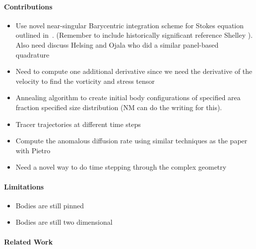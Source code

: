 \documentclass[preprint, 10pt]{elsarticle}
\begin{document}
\paragraph{Contributions}
\begin{itemize}
  \item Use novel near-singular Barycentric integration scheme for
    Stokes equation outlined in~\cite{bar-wu-vee2015}. (Remember to
    include historically significant reference Shelley
    \cite{baker1986boundary}).  Also need discuss Helsing and Ojala who
    did a similar panel-based quadrature~\cite{hel-oja2008}
  \item Need to compute one additional derivative since we need the
    derivative of the velocity to find the vorticity and stress tensor
  \item Annealing algorithm to create initial body configurations of specified area fraction specified size distribution (NM can do the writing for this).
  \item Tracer trajectories at different time steps
  \item Compute the anomalous diffusion rate using similar techniques as
    the paper with Pietro~\cite{dea-qua-bir-jua2018}
  \item Need a novel way to do time stepping through the complex
    geometry
\end{itemize}

\paragraph{Limitations}
\begin{itemize}
  \item Bodies are still pinned
  \item Bodies are still two dimensional
\end{itemize}

\paragraph{Related Work}
\end{document}
